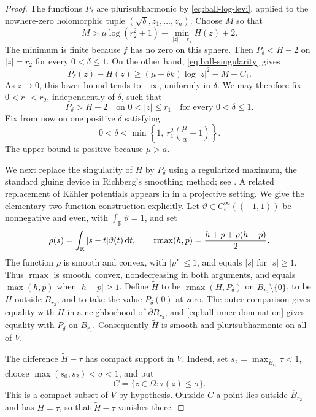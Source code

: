 \begin{proof}
The functions $P_\delta$ are plurisubharmonic by \eqref{eq:ball-log-levi}, applied to the nowhere-zero holomorphic tuple $(\sqrt\delta,z_1,\ldots,z_n)$.  Choose $M$ so that
\[
 M>\mu\log(r_2^2+1)-\min_{|z|=r_2}H(z)+2.
\]
The minimum is finite because $f$ has no zero on this sphere.  Then $P_\delta<H-2$ on $|z|=r_2$ for every $0<\delta\le1$. On the other hand, \eqref{eq:ball-singularity} gives
\[
 P_\delta(z)-H(z)
 \ge(\mu-bk)\log|z|^2-M-C_1.
\]
As $z\to0$, this lower bound tends to $+\infty$, uniformly in $\delta$. We may therefore fix $0<r_1<r_2$, independently of $\delta$, such that
\begin{equation}
 P_\delta>H+2\quad\text{on }0<|z|\le r_1
 \quad\text{for every }0<\delta\le1.
 \label{eq:ball-inner-domination}
\end{equation}
Fix from now on one positive $\delta$ satisfying
\begin{equation}
 0<\delta<\min\left\{1,\ r_1^2\left(\frac\mu a-1\right)\right\}.
 \label{eq:ball-delta-choice}
\end{equation}
The upper bound is positive because $\mu>a$.

We next replace the singularity of $H$ by $P_\delta$ using a regularized maximum, the standard gluing device in Richberg's smoothing method; see \cite[Section~2]{HarveyLawsonPlis2020}. A related replacement of K\"ahler potentials appears in \cite[Proposition~3.3]{WittNystrom2018} in a projective setting. We give the elementary two-function construction explicitly. Let $\vartheta\in C_c^\infty((-1,1))$ be nonnegative and even, with $\int_{\mathbb{R}}\vartheta=1$, and set
\[
 \rho(s)=\int_{\mathbb{R}}|s-t|\vartheta(t)\,\mathrm{d} t,
 \qquad
 \operatorname{rmax}(h,p)=\frac{h+p+\rho(h-p)}2.
\]
The function $\rho$ is smooth and convex, with $|\rho'|\le1$, and equals $|s|$ for $|s|\ge1$.  Thus $\operatorname{rmax}$ is smooth, convex, nondecreasing in both arguments, and equals $\max(h,p)$ when $|h-p|\ge1$.  Define $\widetilde H$ to be $\operatorname{rmax}(H,P_\delta)$ on $B_{r_2}\setminus\{0\}$, to be $H$ outside $B_{r_2}$, and to take the value $P_\delta(0)$ at zero. The outer comparison gives equality with $H$ in a neighborhood of $\partial B_{r_2}$, and \eqref{eq:ball-inner-domination} gives equality with $P_\delta$ on $B_{r_1}$.  Consequently $\widetilde H$ is smooth and plurisubharmonic on all of $V$.

The difference $\widetilde H-\tau$ has compact support in $V$. Indeed, set $s_2=\max_{\overline B_{r_2}}\tau<1$, choose $\max(s_0,s_2)<\sigma<1$, and put
\begin{equation}
 C=\{z\in\Omega:\tau(z)\le\sigma\}.
 \label{eq:ball-support}
\end{equation}
This is a compact subset of $V$ by hypothesis.  Outside $C$ a point lies outside $\overline B_{r_2}$ and has $H=\tau$, so that $\widetilde H-\tau$ vanishes there.


\end{proof}
